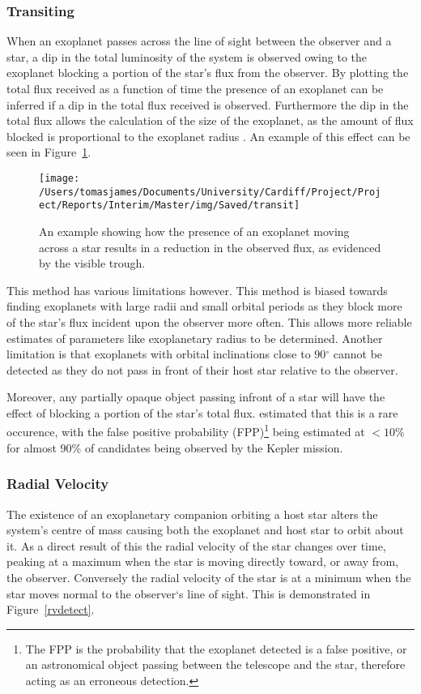 \documentclass[twoside,4pt]{article}
\begin{document}
\begin{multicols}{2}
\subsubsection{Transiting}
When an exoplanet passes across the line of sight between the observer and a star, a dip in the total luminosity of the system is observed owing to the exoplanet blocking a portion of the star's flux from the observer. By plotting the total flux received as a function of time the presence of an exoplanet can be inferred if a dip in the total flux received is observed. Furthermore the dip in the total flux allows the calculation of the size of the exoplanet, as the amount of flux blocked is proportional to the exoplanet radius \parencite{radius}. An example of this effect can be seen in Figure~\ref{Transit}.

\begin{figure}[H]
\centering
    \texttt{[image: /Users/tomasjames/Documents/University/Cardiff/Project/Project/Reports/Interim/Master/img/Saved/transit]}
\caption[An example showing how the presence of an exoplanet moving across a star results in a reduction in the observed flux, as evidenced by the visible trough.]{An example showing how the presence of an exoplanet moving across a star results in a reduction in the observed flux, as evidenced by the visible trough. \parencite{transitimg}}\label{Transit}
\end{figure}

This method has various limitations however. This method is biased towards finding exoplanets with large radii and small orbital periods as they block more of the star’s flux incident upon the observer more often. This allows more reliable estimates of parameters like exoplanetary radius to be determined. Another limitation is that exoplanets with orbital inclinations close to 90$^\circ$ cannot be detected as they do not pass in front of their host star relative to the observer.

Moreover, any partially opaque object passing infront of a star will have the effect of blocking a portion of the star's total flux. \textcite{false} estimated that this is a rare occurence, with the false positive probability (FPP)\footnote{The FPP is the probability that the exoplanet detected is a false positive, or an astronomical object passing between the telescope and the star, therefore acting as an erroneous detection.} being estimated at $<10\%$ for almost 90\% of candidates being observed by the Kepler mission.

\subsubsection{Radial Velocity }
The existence of an exoplanetary companion orbiting a host star alters the system's centre of mass causing both the exoplanet and host star to orbit about it. As a direct result of this the radial velocity of the star changes over time, peaking at a maximum when the star is moving directly toward, or away from, the observer. Conversely the radial velocity of the star is at a minimum when the star moves normal to the observer`s line of sight. This is demonstrated in Figure~\ref{rvdetect}.


\end{multicols}
\end{document}
